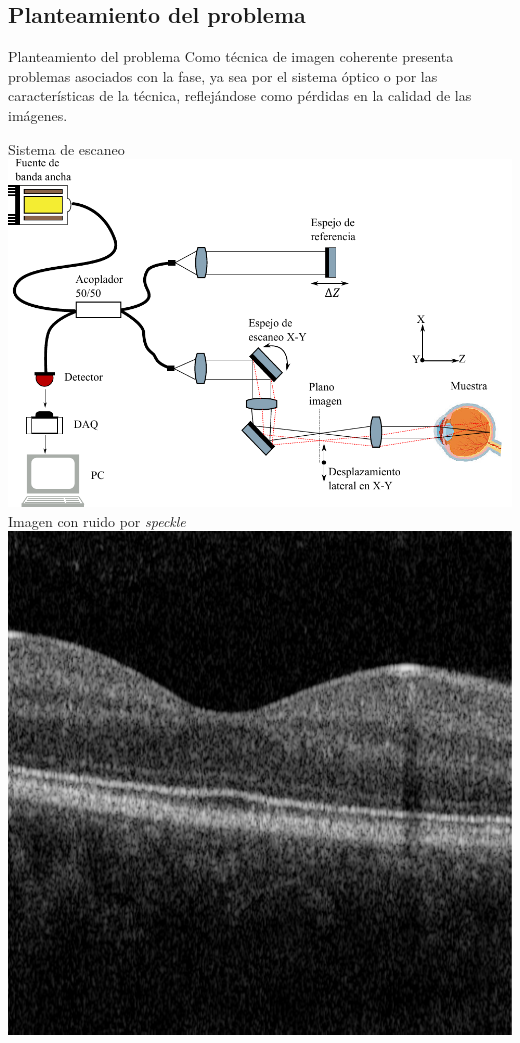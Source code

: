 \documentclass[fleqn,10pt]{beamer}
\begin{document}
\subsection{Planteamiento del problema}
\begin{frame}{Planteamiento del problema}
	Como técnica de imagen coherente presenta problemas asociados con la fase, ya sea por el sistema óptico o por las características de la técnica, reflejándose como pérdidas en la calidad de las imágenes.
	
	\vfill
	\begin{multicols}{2}
		\centering
		Sistema de escaneo
		\includegraphics[width=1\linewidth]{AAUgraphics/pt2/scaning_system_oc}
		\newpage
		Imagen con ruido por \emph{speckle}
		\includegraphics[width=0.8\linewidth]{AAUgraphics/pt3/Retinal_NoisyImage_Bscan128}
	\end{multicols}
\end{frame}
\end{document}

